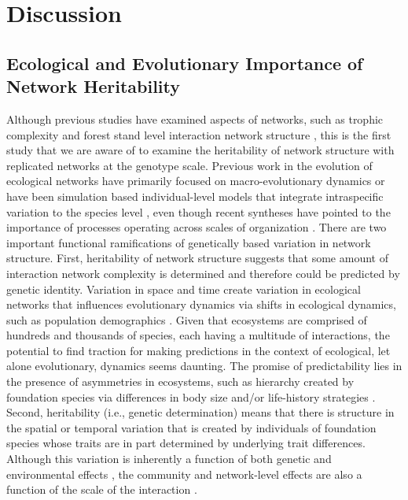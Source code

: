 \documentclass[fleqn,12pt]{olplainarticle}
\begin{document}
\section*{Discussion}


\subsection*{Ecological and Evolutionary Importance of Network Heritability}

Although previous studies have examined aspects of networks, such as
trophic complexity \citep{Barbour2016GeneticComplexity} and forest
stand level interaction network structure
\citep{Lau2016GenotypicEvolution, Keith2017}, this is the first study
that we are aware of to examine the heritability of network structure
with replicated networks at the genotype scale. Previous work in the
evolution of ecological networks have primarily focused on
macro-evolutionary dynamics \citep{Rezende2007,
  Weber2017EvolutionMacroevolution, Valverde2018TheSpandrel,
  Harmon2019DetectingInteractions} or have been simulation based
individual-level models that integrate intraspecific variation to the
species level \citep{Maliet2020AnNetworks}, even though recent
syntheses have pointed to the importance of processes operating across
scales of organization \citep{Guimaraes2020TheOrganization}. There are
two important functional ramifications of genetically based variation
in network structure. First, heritability of network structure
suggests that some amount of interaction network complexity is
determined and therefore could be predicted by genetic
identity. Variation in space and time create variation in ecological
networks that influences evolutionary dynamics via shifts in
ecological dynamics, such as population demographics
\citep{Guimaraes2020TheOrganization}. Given that ecosystems are
comprised of hundreds and thousands of species, each having a
multitude of interactions, the potential to find traction for making
predictions in the context of ecological, let alone evolutionary,
dynamics seems daunting. The promise of predictability lies in the
presence of asymmetries in ecosystems, such as hierarchy created by
foundation species via differences in body size and/or life-history
strategies \citep{Ellison2005}. Second, heritability (i.e., genetic
determination) means that there is structure in the spatial or
temporal variation that is created by individuals of foundation
species whose traits are in part determined by underlying trait
differences. Although this variation is inherently a function of both
genetic and environmental effects \citep{Conner2004ATextbook}, the
community and network-level effects are also a function of the scale
of the interaction \citep{Shuster2006COMMUNITYSTRUCTURE, Lau2017a}.
\end{document}
